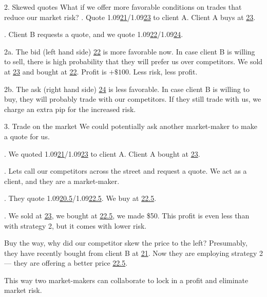 \documentclass{beamer}
\begin{document}
\begin{frame}{2. Skewed quotes}
\justify
What if we offer more favorable conditions on trades that reduce our market risk?
. Quote 1.09\underline{21}/1.09\underline{23} to client A. Client A buys at \underline{23}.

. Client B requests a quote, and we quote 1.09\underline{22}/1.09\underline{24}.

\justify
2a. The bid (left hand side) \underline{22} is more favorable now. In case client B is willing to sell, there is high probability that they will prefer us over competitors. We sold at \underline{23} and bought at \underline{22}. Profit is $+\$100$. Less risk, less profit.

\justify
2b. The ask (right hand side) \underline{24} is less favorable. In case client B is willing to buy, they will probably trade with our competitors. If they still trade with us, we charge an extra pip for the increased risk.
\end{frame}



\begin{frame}{3. Trade on the market }
\justify
We could potentially ask another market-maker to make a quote for us.

. We quoted 1.09\underline{21}/1.09\underline{23} to client A. Client A bought at \underline{23}.

. Lets call our competitors across the street and request a quote. We act as a client, and they are a market-maker.

. They quote 1.09\underline{20.5}/1.09\underline{22.5}. We buy at \underline{22.5}.

. We sold at \underline{23}, we bought at \underline{22.5}, we made \$50. This profit is even less than with strategy 2, but it comes with lower risk.

\justify
Buy the way, why did our competitor skew the price to the left? Presumably, they have recently bought from client B at \underline{21}. Now they are employing strategy 2 --- they are offering a better price \underline{22.5}.

\justify
This way two market-makers can collaborate to lock in a profit and eliminate market risk.
\end{frame}
\end{document}

